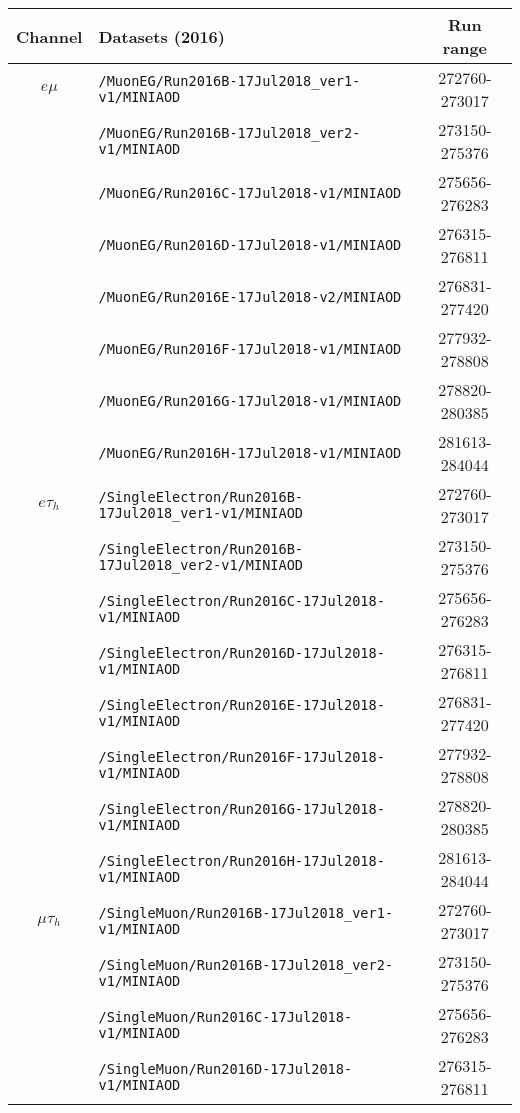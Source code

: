 \begin{table}[ht]
    \begin{center}
    {\scriptsize
    \begin{tabular}{|c|l|c|}
    \hline
    Channel & Datasets (2016) & Run range\\
    \hline
    $e\mu$ & \texttt{/MuonEG/Run2016B-17Jul2018\_ver1-v1/MINIAOD} & 272760-273017\\
    & \texttt{/MuonEG/Run2016B-17Jul2018\_ver2-v1/MINIAOD} & 273150-275376\\
    & \texttt{/MuonEG/Run2016C-17Jul2018-v1/MINIAOD} & 275656-276283\\
    & \texttt{/MuonEG/Run2016D-17Jul2018-v1/MINIAOD} & 276315-276811\\
    & \texttt{/MuonEG/Run2016E-17Jul2018-v2/MINIAOD} & 276831-277420\\
    & \texttt{/MuonEG/Run2016F-17Jul2018-v1/MINIAOD} & 277932-278808\\
    & \texttt{/MuonEG/Run2016G-17Jul2018-v1/MINIAOD} & 278820-280385\\
    & \texttt{/MuonEG/Run2016H-17Jul2018-v1/MINIAOD} & 281613-284044\\
    \hline
    $e\tau_{h}$ & \texttt{/SingleElectron/Run2016B-17Jul2018\_ver1-v1/MINIAOD} & 272760-273017\\
    & \texttt{/SingleElectron/Run2016B-17Jul2018\_ver2-v1/MINIAOD} & 273150-275376\\
    & \texttt{/SingleElectron/Run2016C-17Jul2018-v1/MINIAOD} & 275656-276283\\
    & \texttt{/SingleElectron/Run2016D-17Jul2018-v1/MINIAOD} & 276315-276811\\
    & \texttt{/SingleElectron/Run2016E-17Jul2018-v1/MINIAOD} & 276831-277420\\
    & \texttt{/SingleElectron/Run2016F-17Jul2018-v1/MINIAOD} & 277932-278808\\
    & \texttt{/SingleElectron/Run2016G-17Jul2018-v1/MINIAOD} & 278820-280385\\
    & \texttt{/SingleElectron/Run2016H-17Jul2018-v1/MINIAOD} & 281613-284044\\
    \hline
    $\mu\tau_{h}$ & \texttt{/SingleMuon/Run2016B-17Jul2018\_ver1-v1/MINIAOD} & 272760-273017\\
    & \texttt{/SingleMuon/Run2016B-17Jul2018\_ver2-v1/MINIAOD} & 273150-275376\\
    & \texttt{/SingleMuon/Run2016C-17Jul2018-v1/MINIAOD} & 275656-276283\\
    & \texttt{/SingleMuon/Run2016D-17Jul2018-v1/MINIAOD} & 276315-276811\\

\end{tabular}}
\end{center}
\end{table}
